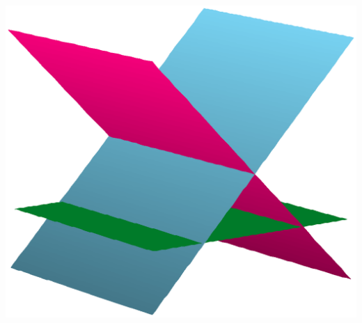 \documentclass{report}
\theoremstyle{definition}
\begin{document}
\hfill
\begin{minipage}{0.3\linewidth}
	\begin{center}
		\includegraphics[scale=0.25]{TrianglePlane.eps}
	\end{center}
\end{minipage}
\end{document}
